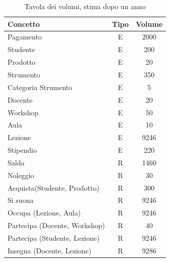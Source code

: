 \newpage
\renewcommand{\arraystretch}{1.5}
\begin{xltabular}{\textwidth}{|>{\raggedright\arraybackslash}p{4cm}|c|c|}
\caption{Tavola dei volumi, stima dopo un anno}
    \label{tab:dizionario} \\
    \hline
    \textbf{Concetto} & \textbf{Tipo} & \textbf{Volume} \\
    \hline
    Pagamento & E & 2000 \\
    \hline
    Studente & E & 200 \\
    \hline
    Prodotto & E & 20 \\ 
    \hline
    Strumento & E & 350 \\ 
    \hline
    Categoria Strumento & E & 5 \\ 
    \hline
    Docente & E & 20 \\ 
    \hline
    Workshop & E & 50 \\ 
    \hline
    Aula & E & 10 \\ 
    \hline
    Lezione & E & 9246 \\ %
    \hline
    Stipendio & E & 220 \\ 
    \hline
    Salda & R & 1460 \\ 
    \hline
    Noleggio & R & 30 \\ 
    \hline
    Acquista(Studente, Prodotto) & R & 300 \\ 
    \hline
    Si suona & R & 9246 \\ 
    \hline
    Occupa \newline (Lezione, Aula) & R & 9246 \\ 
    \hline
    Partecipa \newline (Docente, Workshop) & R & 40 \\ 
    \hline
    Partecipa \newline (Studente, Lezione) & R & 9246 \\ 
    \hline
    Insegna \newline (Docente, Lezione) & R & 9286 \\ 
    \hline
\end{xltabular}
\renewcommand{\arraystretch}{1.5}
